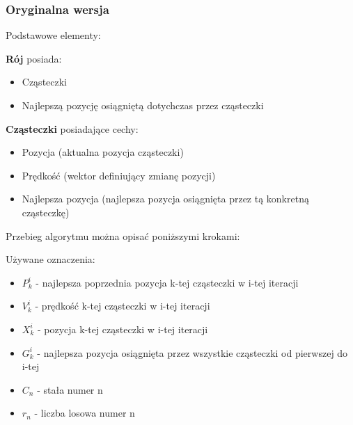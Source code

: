 \subsubsection{Oryginalna wersja}
\par Podstawowe elementy:
\begin{description}
  \item \textbf{Rój} posiada:
    \begin{itemize}
      \item Cząsteczki 
      \item Najlepszą pozycję osiągniętą dotychczas przez cząsteczki
    \end{itemize}
  \item \textbf{Cząsteczki} posiadające cechy:
    \begin{itemize}
      \item Pozycja (aktualna pozycja cząsteczki)
      \item Prędkość (wektor definiujący zmianę pozycji)
      \item Najlepsza pozycja (najlepsza pozycja osiągnięta przez tą konkretną cząsteczkę)
    \end{itemize}
\end{description}
\par Przebieg algorytmu można opisać poniższymi krokami: 
\par Używane oznaczenia: 
\begin{itemize}
  \item $P^{i}_{k}$ - najlepsza poprzednia pozycja k-tej cząsteczki w i-tej iteracji 
  \item $V^{i}_{k}$ - prędkość k-tej cząsteczki w i-tej iteracji 
  \item $X^{i}_{k}$ - pozycja k-tej cząsteczki w i-tej iteracji
  \item $G^{i}_{k}$ - najlepsza pozycja osiągnięta przez wszystkie cząsteczki od pierwszej do i-tej 
  \item $C_{n}$ - stała numer n
  \item $r_{n}$ - liczba losowa numer n

\end{itemize}
